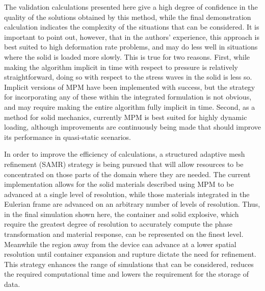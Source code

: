 The validation calculations presented here give a high degree of confidence
in the quality of the solutions obtained by this method, while the final 
demonstration calculation indicates the complexity of the situations that 
can be considered.  It is important to point out, however, that in the 
authors' experience, this approach is best suited to high deformation rate
problems, and may do less well in situations where the solid is loaded more 
slowly.  This is true for two reasons.  First, while making the algorithm 
implicit in time with respect to pressure is relatively straightforward, doing 
so with respect to the stress waves in the solid is less so.  Implicit 
versions of MPM have been implemented with success, but the strategy for 
incorporating any of these within the integrated formulation is not 
obvious, and may require making the entire algorithm fully implicit in 
time.  Second, as a method for solid mechanics, currently MPM is best suited 
for highly dynamic loading, although improvements are continuously being made
that should improve its performance in quasi-static scenarios.

In order to improve the efficiency of calculations, a structured adaptive mesh 
refinement (SAMR) strategy is being pursued that will allow resources to be 
concentrated on those parts of the domain where they are needed.  The current 
implementation allows for the solid materials described using MPM to be 
advanced at a single level of resolution, while those materials integrated
in the Eulerian frame are advanced on an arbitrary number of levels of 
resolution.  Thus, in the final simulation shown here, the container and 
solid explosive, which require the greatest degree of resolution to accurately 
compute the phase transformation and material response, can be represented on 
the finest level.  Meanwhile the region away from the device can advance at a 
lower spatial resolution until container expansion and rupture dictate the need 
for refinement.  This strategy enhances the range of simulations that can be 
considered, reduces the required computational time and lowers the requirement 
for the storage of data.
